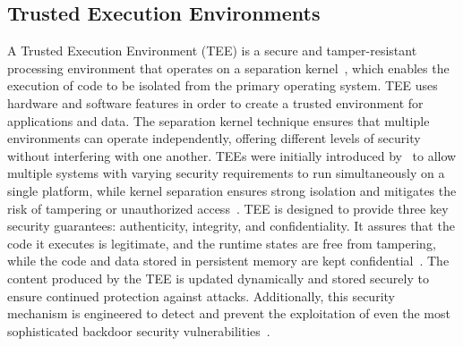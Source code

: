 \subsection{Trusted Execution Environments}
A Trusted Execution Environment (TEE) is a secure and tamper-resistant processing environment that operates on a separation kernel~\cite{mcgillion2015open}, which enables the execution of code to be isolated from the primary operating system. TEE uses hardware and software features in order to create a trusted environment for applications and data. The separation kernel technique ensures that multiple environments can operate independently, offering different levels of security without interfering with one another. TEEs were initially introduced by~\cite{rushby1981design} to allow multiple systems with varying security requirements to run simultaneously on a single platform, while kernel separation ensures strong isolation and mitigates the risk of tampering or unauthorized access~\cite{frohlich2023secure}. TEE is designed to provide three key security guarantees: authenticity, integrity, and confidentiality. It assures that the code it executes is legitimate, and the runtime states are free from tampering, while the code and data stored in persistent memory are kept confidential~\cite{sebastian2019tee}. The content produced by the TEE is updated dynamically and stored securely to ensure continued protection against attacks. Additionally, this security mechanism is engineered to detect and prevent the exploitation of even the most sophisticated backdoor security vulnerabilities~\cite{DBLP:conf/trustcom/SabtAB15}.

